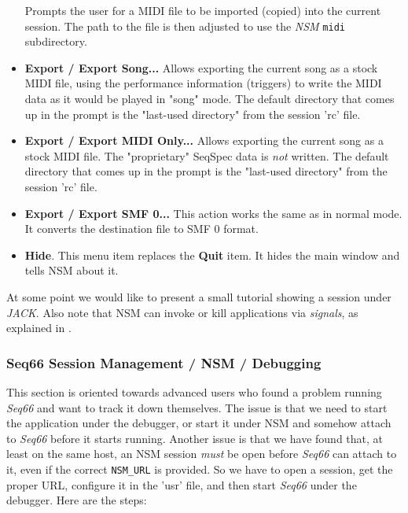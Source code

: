 \begin{itemize}
         Prompts the user for a MIDI file to
         be imported (copied) into the current session.  The path to the file
         is then adjusted to use the \textsl{NSM} \texttt{midi} subdirectory.
      \item \textbf{Export / Export Song...}
         Allows exporting the current song as a stock MIDI file, using the
         performance information (triggers) to write the MIDI data as it would
         be played in "song" mode.
         The default directory that comes up in the
         prompt is the "last-used directory" from the session 'rc' file.
      \item \textbf{Export / Export MIDI Only...}
         Allows exporting the current song as a stock MIDI file.
         The "proprietary" SeqSpec data is \textsl{not} written.
         The default directory that comes up in the
         prompt is the "last-used directory" from the session 'rc' file.
      \item \textbf{Export / Export SMF 0...}
         This action works the same as in normal mode.
         It converts the destination file to SMF 0 format.
      \item \textbf{Hide}.
         This menu item replaces the \textbf{Quit} item.
         It hides the main window and tells NSM about it.
   \end{itemize}

   At some point we would like to present a small tutorial showing a session
   under \textsl{JACK}.
   Also note that NSM can invoke or kill applications via
   \textsl{signals}, as explained in 
   .

\subsubsection{Seq66 Session Management / NSM / Debugging}
\label{subsubsec:sessions_debugging}

   This section is oriented towards advanced users who found a problem running
   \textsl{Seq66} and want to track it down themselves.  The issue is that we
   need to start the application under the debugger, or start it under NSM and
   somehow attach to \textsl{Seq66} before it starts running.  Another issue is
   that we have found that, at least on the same host, an NSM session
   \textsl{must} be open before \textsl{Seq66} can attach to it, even if the
   correct \texttt{NSM\_URL} is provided.
   So we have to open a session, get the proper URL, configure it in the 'usr'
   file, and then start \textsl{Seq66} under the debugger.
   Here are the steps:

